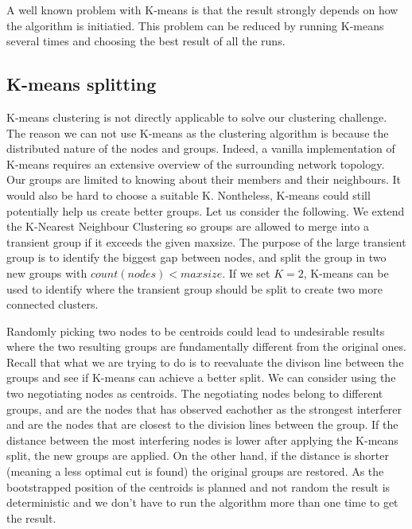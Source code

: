 A well known problem with K-means is that the result strongly depends on how the algorithm is initiatied. This problem can be reduced by running K-means several times
and choosing the best result of all the runs. 

\subsection{K-means splitting}
K-means clustering is not directly applicable to solve our clustering challenge. The reason we can not use K-means as the clustering algorithm is because the distributed nature of
the nodes and groups. Indeed, a vanilla implementation of K-means requires an extensive overview of the surrounding network topology. Our groups are limited to knowing about their members
and their neighbours. It would also be hard to choose a suitable K. Nontheless, K-means could still potentially help us create better groups. Let us consider the following.
We extend the K-Nearest Neighbour Clustering so groups are allowed to merge into a transient group if it exceeds the given maxsize.
The purpose of the large transient group is to identify the biggest gap between nodes, and split the group in two new groups with
$count(nodes) < maxsize$. If we set $K=2$, K-means can be used to identify where the transient group should be split to create two more connected clusters. 

Randomly picking two nodes to be centroids could lead to undesirable results where the two resulting groups are fundamentally different from the original ones.
Recall that what  we are trying to do is to reevaluate the divison line between the groups and see if K-means can achieve a better split. We can consider using the two negotiating nodes as centroids.
The negotiating nodes belong to different groups, and are the nodes that has observed eachother as the strongest interferer and are the nodes that are closest to the division lines between the group. If the distance between the most interfering nodes is lower after applying the K-means split, the new groups are applied.
On the other hand, if the distance is shorter (meaning a less optimal cut is found) the original groups are restored.
As the bootstrapped position of the centroids is planned and not random the result is deterministic and we don't have to run the algorithm more than one time to get the result. 
%



